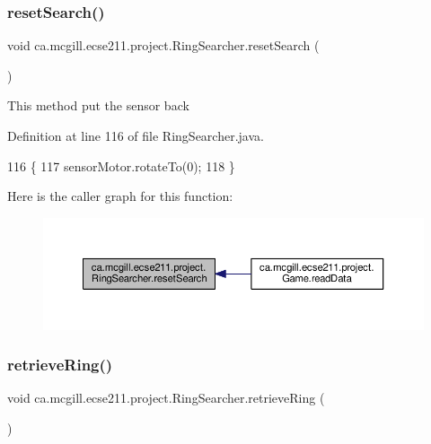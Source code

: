 \subsubsection{\texorpdfstring{reset\+Search()}{resetSearch()}}
{\footnotesize\ttfamily void ca.\+mcgill.\+ecse211.\+project.\+Ring\+Searcher.\+reset\+Search (\begin{DoxyParamCaption}{ }\end{DoxyParamCaption})}

This method put the sensor back 

Definition at line 116 of file Ring\+Searcher.\+java.


\begin{DoxyCode}
116                             \{
117     sensorMotor.rotateTo(0);
118   \}
\end{DoxyCode}
Here is the caller graph for this function\+:
\nopagebreak
\begin{figure}[H]
\begin{center}
\leavevmode
\includegraphics[width=350pt]{classca_1_1mcgill_1_1ecse211_1_1project_1_1_ring_searcher_ad73c50b29163d91292de418101cce21e_icgraph}
\end{center}
\end{figure}
\mbox{\label{classca_1_1mcgill_1_1ecse211_1_1project_1_1_ring_searcher_afca3a0c746b07abb88881d926f4fe71f}} 
\subsubsection{\texorpdfstring{retrieve\+Ring()}{retrieveRing()}}
{\footnotesize\ttfamily void ca.\+mcgill.\+ecse211.\+project.\+Ring\+Searcher.\+retrieve\+Ring (\begin{DoxyParamCaption}{ }\end{DoxyParamCaption})}

